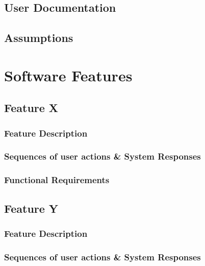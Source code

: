 \documentclass[a4paper,12pt]{article}
\begin{document}
\subsection{User Documentation}
\subsection{Assumptions}
\section{Software Features}
\subsection{Feature X}
\subsubsection{Feature Description}
\subsubsection{Sequences of user actions & System Responses}
\subsubsection{Functional Requirements}

\subsection{Feature Y}
\subsubsection{Feature Description}
\subsubsection{Sequences of user actions & System Responses}
\end{document}
